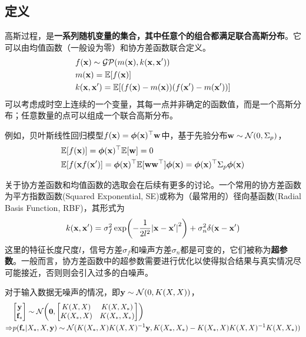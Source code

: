 \documentclass[12pt,UTF8]{article}
\begin{document}
        \subsection{定义}
            高斯过程，是\textbf{一系列随机变量的集合，其中任意个的组合都满足联合高斯分布}。它可以由均值函数（一般设为零）和协方差函数联合定义。
            \begin{align}
                &f(\vb{x})\sim\mathcal{GP}(m(\vb{x}),k(\vb{x},\vb{x}')) \\
                &m(\vb{x})=\mathbb{E}[f(\vb{x})] \\
                &k(\vb{x},\vb{x}')=\mathbb{E}[(f(\vb{x})-m(\vb{x}))(f(\vb{x}')-m(\vb{x}'))]
            \end{align}
            可以考虑成时空上连续的一个变量，其每一点并非确定的函数值，而是一个高斯分布；任意数量的点可以组成一个联合高斯分布。\par
            例如，贝叶斯线性回归模型$f(\vb{x})=\vb*{\phi}(\vb{x})^\top\vb{w}$中，基于先验分布$\vb{w}\sim\mathcal{N}(0,\Sigma_p)$，
            \begin{align}                
                &\mathbb{E}[f(\vb{x})]=\vb*{\phi}(\vb{x})^\top\mathbb{E}[\vb{w}]=0 \\
                &\mathbb{E}[f(\vb{x}f(\vb{x}')]=\vb*{\phi}(\vb{x})^\top\mathbb{E}[\vb{w}\vb{w}^\top]\vb*{\phi}(\vb{x})=\vb*{\phi}(\vb{x})^\top\Sigma_p\vb*{\phi}(\vb{x})
            \end{align}\par
            关于协方差函数和均值函数的选取会在后续有更多的讨论。一个常用的协方差函数为平方指数函数(Squared Exponential, SE)或称为（最常用的）径向基函数(Radial Basis Function, RBF)，其形式为
            \begin{equation}
                k(\vb{x},\vb{x}')=\sigma_f^2\exp(-\frac{1}{2l^2}\abs{\vb{x}-\vb{x}'}^2)+\sigma_n^2\delta(\vb{x}-\vb{x}')
            \end{equation}
            这里的特征长度尺度$l$，信号方差$\sigma_f$和噪声方差$\sigma_n$都是可变的，它们被称为\textbf{超参数}。一般而言，协方差函数中的超参数需要进行优化以使得拟合结果与真实情况尽可能接近，否则则会引入过多的白噪声。\par
            对于输入数据无噪声的情况，即$\vb{y}\sim\mathcal{N}(0,K(X,X))$，
            \begin{align}
                &\mqty[\vb{y}\\\vb{f}_*]\sim\mathcal{N}\qty(\vb{0},\mqty[K(X,X)&K(X,X_*)\\K(X_*,X)&K(X_*,X_*)])\\
                \Rightarrow&p(\vb{f}_*|X_*,X,\vb{y})\sim\mathcal{N}(K(X_*,X)K(X,X)^{-1}\vb{y},K(X_*,X_*)-K(X_*,X)K(X,X)^{-1}K(X,X_*))
            \end{align}
\end{document}
